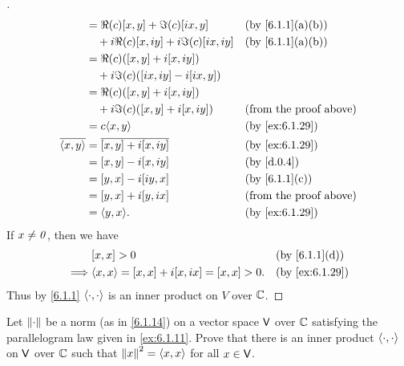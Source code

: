 \begin{proof}[]
\begin{align*}
                      & = \Re(c) [x, y] + \Im(c) [ix, y]                            &  & \text{(by \cref{6.1.1}(a)(b))} \\
                      & \quad + i \Re(c) [x, iy] + i \Im(c) [ix, iy]                &  & \text{(by \cref{6.1.1}(a)(b))} \\
                      & = \Re(c) ([x, y] + i[x, iy])                                                                    \\
                      & \quad + i \Im(c) ([ix, iy] - i[ix, y])                                                          \\
                      & = \Re(c) ([x, y] + i[x, iy])                                                                    \\
                      & \quad + i \Im(c) ([x, y] + i[x, iy])                        &  & \text{(from the proof above)}  \\
                      & = c \inn{x, y}                                              &  & \text{(by \cref{ex:6.1.29})}   \\
    \conj{\inn{x, y}} & = \conj{[x, y] + i[x, iy]}                                  &  & \text{(by \cref{ex:6.1.29})}   \\
                      & = [x, y] - i[x, iy]                                         &  & \text{(by \cref{d.0.4})}       \\
                      & = [y, x] - i[iy, x]                                         &  & \text{(by \cref{6.1.1}(c))}    \\
                      & = [y, x] + i[y, ix]                                         &  & \text{(from the proof above)}  \\
                      & = \inn{y, x}.                                               &  & \text{(by \cref{ex:6.1.29})}
  \end{align*}
  If \(x \neq \mathit{0}\), then we have
  \begin{align*}
             & [x, x] > 0                                   &  & \text{(by \cref{6.1.1}(d))}  \\
    \implies & \inn{x, x} = [x, x] + i[x, ix] = [x, x] > 0. &  & \text{(by \cref{ex:6.1.29})}
  \end{align*}
  Thus by \cref{6.1.1} \(\left\langle\cdot, \cdot\right\rangle\) is an inner product on \(V\) over \(\mathbb{C}\).
\end{proof}

\begin{ex}\label{ex:6.1.30}
  Let \(\left\lVert\cdot\right\rVert\) be a norm (as in \cref{6.1.14}) on a vector space \(\mathsf{V}\) over \(\mathbb{C}\) satisfying the parallelogram law given in \cref{ex:6.1.11}.
  Prove that there is an inner product \(\left\langle\cdot, \cdot\right\rangle\) on \(\mathsf{V}\) over \(\mathbb{C}\) such that \(\left\lVert x\right\rVert^2 = \left\langle x, x\right\rangle\) for all \(x \in \mathsf{V}\).
\end{ex}

